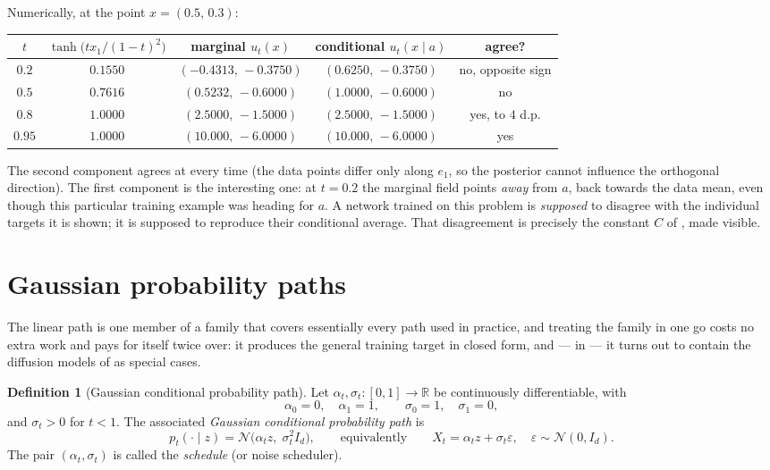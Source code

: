 \documentclass[11pt,a4paper]{report}
\theoremstyle{definition}
\newtheorem{definition}[definition]{Definition}
\theoremstyle{remark}
\newcommand{\RR}{\mathbb R}
\begin{document}
Numerically, at the point $x=(0.5,\,0.3)$:

\begin{center}
\begin{tabular}{ccccc}
\toprule
$t$ & $\tanh\bigl(tx_1/(1-t)^2\bigr)$ & marginal $u_t(x)$ & conditional $u_t(x\mid a)$ & agree? \\
\midrule
$0.2$  & $0.1550$ & $(-0.4313,\,-0.3750)$ & $(0.6250,\,-0.3750)$ & no, opposite sign \\
$0.5$  & $0.7616$ & $(0.5232,\,-0.6000)$  & $(1.0000,\,-0.6000)$ & no \\
$0.8$  & $1.0000$ & $(2.5000,\,-1.5000)$  & $(2.5000,\,-1.5000)$ & yes, to $4$ d.p. \\
$0.95$ & $1.0000$ & $(10.000,\,-6.0000)$  & $(10.000,\,-6.0000)$ & yes \\
\bottomrule
\end{tabular}
\end{center}

The second component agrees at every time (the data points differ only
along $e_1$, so the posterior cannot influence the orthogonal direction).
The first component is the interesting one: at $t=0.2$ the marginal field
points \emph{away} from $a$, back towards the data mean, even though this
particular training example was heading for $a$. A network trained on this
problem is \emph{supposed} to disagree with the individual targets it is
shown; it is supposed to reproduce their conditional average. That
disagreement is precisely the constant $C$ of
, made visible.

\section{Gaussian probability paths}
\label{sec:gaussian-paths}

The linear path is one member of a family that covers essentially every
path used in practice, and treating the family in one go costs no extra
work and pays for itself twice over: it produces the general training
target in closed form, and --- in  --- it turns
out to contain the diffusion models of  as
special cases.

\begin{definition}[Gaussian conditional probability path]
\label{def:gaussian-path}
Let $\alpha_t,\sigma_t:[0,1]\to\RR$ be continuously differentiable, with
\[
\alpha_0=0,\quad \alpha_1=1,
\qquad
\sigma_0=1,\quad \sigma_1=0 ,
\]
and $\sigma_t>0$ for $t<1$. The associated \emph{Gaussian conditional
probability path} is
\begin{equation}
\label{eq:gaussian-path}
p_t(\cdot\mid z) = \mathcal N\bigl(\alpha_tz,\;\sigma_t^2I_d\bigr) ,
\qquad\text{equivalently}\qquad
X_t = \alpha_t z + \sigma_t\varepsilon,\quad \varepsilon\sim\mathcal N(0,I_d) .
\end{equation}
The pair $(\alpha_t,\sigma_t)$ is called the \emph{schedule} (or noise
scheduler).
\end{definition}
\end{document}
